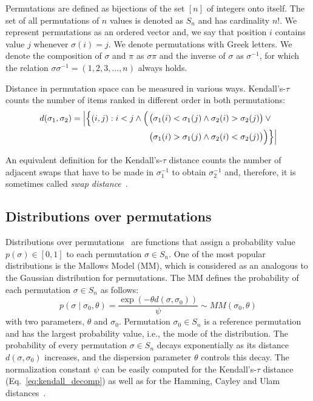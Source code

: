 \documentclass[runningheads]{llncs}
\newcommand{\Prob}{\ensuremath{p}}
\begin{document}
Permutations are defined as bijections of the set $[n]$ of integers onto itself. The set of all permutations of $n$ values is denoted as $S_n$ and has cardinality $n!$. We represent permutations as an ordered vector and, we say that position $i$ contains value $j$ whenever $\sigma(i)=j$. We denote permutations with Greek letters.
We denote the composition of $\sigma$ and $\pi$ as $\sigma\pi$ and the inverse of $\sigma$ as $\sigma^{-1}$, for which the relation $\sigma\sigma^{-1}=(1, 2, 3, \dotsc,n)$ always holds.


Distance in permutation space can be measured in various ways.  Kendall's-$\tau$ counts the number of items ranked in different order in both permutations:
%
\begin{equation}
\begin{split}
d(\sigma _{1},\sigma_{2})=\left\lvert\Bigl\{(i,j):i<j \land \phantom{}\Bigl(\right.&\bigl(\sigma_{1}(i) < \sigma_{1}(j)\land \sigma_{2}(i)>\sigma_{2}(j)\bigr)\lor \phantom{} \\
 &\bigl(\sigma_{1}(i)>\sigma_{1}(j)\land \sigma_{2}(i)<\sigma_{2}(j)\bigr)\Bigr)\Bigr\}\Bigr\rvert\\
 \end{split}
 \label{eq:kendall_decomp}
\end{equation}

An equivalent definition for the Kendall's-$\tau$ distance counts the number of adjacent swaps that have to be made in $\sigma_1^{-1}$ to obtain $\sigma_2^{-1}$ and, therefore, it is sometimes called \emph{swap distance}~\citep{ZaeStoBar2014:ppsn}.


\subsection{Distributions over permutations}
Distributions over permutations~\cite{CriFliVer1996rankings} are functions that assign a probability value  $\Prob(\sigma)\in[0,1]$ to each permutation $\sigma \in S_n$. One of the most popular distributions is the Mallows Model (MM), which is considered as an analogous to the Gaussian distribution for permutations. The MM defines the probability of each permutation $\sigma\in S_n$ as follows:
%
\begin{equation}\label{eq:MM}
\Prob(\sigma \mid \sigma_0, \theta )= \frac{\exp(-\theta d(\sigma, \sigma_0))}{\psi} \sim MM(\sigma_0, \theta)
\end{equation}
%
with two parameters, $\theta$ and $\sigma_0$. Permutation $\sigma_0\in S_n$ is a reference permutation and has the largest probability value, i.e., the mode of the distribution. The probability of every permutation $\sigma\in S_n$ decays exponentially as its distance $d(\sigma,\sigma_0)$ increases, and the dispersion parameter $\theta$  controls this decay.  The normalization constant $\psi$ can be easily computed for the Kendall's-$\tau$ distance (Eq.~\eqref{eq:kendall_decomp}) as well as for the Hamming, Cayley and Ulam distances~\cite{IruCalLoz2016permallows}.
\end{document}

